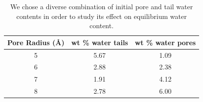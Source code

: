 \documentclass{article}
\begin{document}
\begin{enumerate}
    \begin{table}[!htb]
    \centering
    \begin{tabular}{|c|c|c|}
    \hline
    Pore Radius (\AA) & wt \% water tails & wt \% water pores \\
    \hline
    5                 &        5.67       &     1.09          \\
    6                 &        2.88       &     2.38          \\
    7                 &        1.91       &     4.12          \\
    8                 &        2.78       &     6.00          \\
    \hline
    \end{tabular}
    \caption{We chose a diverse combination of initial pore and tail water
    contents in order to study its effect on equilibrium water
    content.}\label{table:water_content}
    \end{table}


\end{enumerate}
\end{document}
